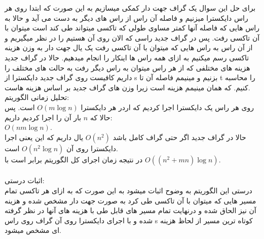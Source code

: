 \problem{}
برای حل این سوال یک گراف جهت دار کمکی میسازیم به این صورت که
 ابتدا روی هر راس دایکسترا میزنیم 
 و فاصله آن راس از راس های دیگر به دست می آید و حالا به راس هایی که فاصله آنها کمتر مساوی
 طولی که تاکسی میتواند طی کند است میتوان با آن تاکسی رفت.
 پس در گراف جدید راسی که الان روی آن هستیم را در نظر میگیریم
 و از آن راس به راس هایی که میتوان با آن تاکسی رفت یک یال جهت دار به وزن هزینه تاکسی رسم میکنیم
 به ازای همه راس ها اینکار را انجام میدهیم.
 حالا در گراف جدید 
 هزینه های مختلفی که از هر راس میتوان به راس دیگر رفت به حالت های مختلف را داریم
 کافیست روی گراف جدید دایکسترا از s بزنیم و مینیمم
 فاصله آن تا t را محاسبه کنیم.
 که همان مینیمم هزینه است زیرا وزن های گراف جدید بر اساس هزینه هاست.
\\
تحلیل زمانی الگوریتم:\\
روی هر راس یک دایکسترا اجرا کردیم که اردر هر دایکسترا $O(m\log{n})$
است. پس حالا که $n$ بار آن را اجرا کردیم داریم:\\
$O(nm\log{n})$.\\
حالا در گراف جدید اگر حتی گراف کامل باشد 
$O(n^2)$ یال داریم که این یعنی اجرا دایکسترا روی آن
$O(n^2\log{n})$
است.\\
در نتیجه زمان اجرای کل الگوریتم برابر است با $O((n^2+mn)\log{n})$.\\\\
اثبات درستی:\\
درستی این الگوریتم به وضوح اثبات میشود
به این صورت که 
به ازای هر تاکسی تمام مسیر هایی که میتوان با آن تاکسی طی کرد به صورت 
جهت دار مشخص شده و هزینه آن نیز الحاق شده
و درنهایت تمام مسیر های قابل طی با هزینه های آنها در نظر گرفته شده
و با اجرای دایکسترا روی آن گراف روی راس s کوتاه ترین
مسیر از لحاظ هزینه ای مشخص میشود.